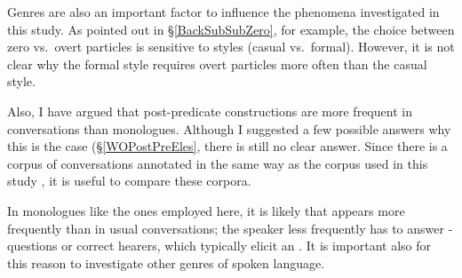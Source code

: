 Genres are also an important factor to influence the phenomena investigated in this study.
As pointed out in \S \ref{BackSubSubZero},
for example,
the choice between zero vs.~overt particles is sensitive to
styles (casual vs.~formal).
However, it is not clear why the formal style requires overt particles more often than
the casual style.

Also, I have argued that
post-predicate constructions are more frequent in conversations than monologues.
Although I suggested a few possible answers why this is the case (\S \ref{WOPostPreEles},
there is still no clear answer.
Since there is a corpus of conversations annotated in the same way as the corpus used in this study \cite{nakagawaden12},
it is useful to compare these corpora.

In monologues like the ones employed here,
it is likely that  appears more frequently than in usual conversations;
 the speaker less frequently has to answer -questions or correct hearers, which typically elicit an .
It is important also for this reason to investigate other genres of spoken language.



